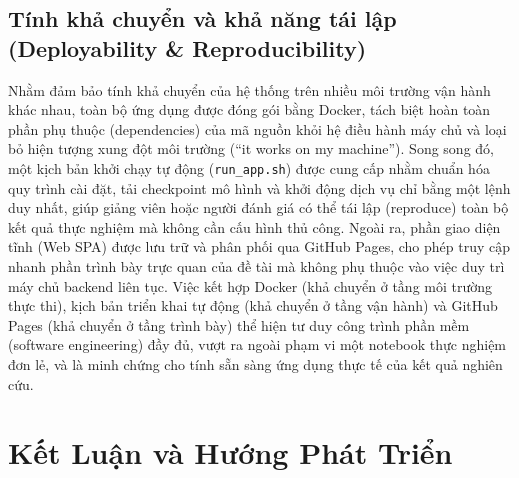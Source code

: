 \documentclass[12pt,a4paper]{article}
\begin{document}
\subsection{Tính khả chuyển và khả năng tái lập (Deployability \& Reproducibility)}\label{sec:demo_deployability}
Nhằm đảm bảo tính khả chuyển của hệ thống trên nhiều môi trường vận hành khác nhau, toàn bộ ứng dụng được đóng gói bằng Docker, tách biệt hoàn toàn phần phụ thuộc (dependencies) của mã nguồn khỏi hệ điều hành máy chủ và loại bỏ hiện tượng xung đột môi trường (``it works on my machine''). Song song đó, một kịch bản khởi chạy tự động (\texttt{run\_app.sh}) được cung cấp nhằm chuẩn hóa quy trình cài đặt, tải checkpoint mô hình và khởi động dịch vụ chỉ bằng một lệnh duy nhất, giúp giảng viên hoặc người đánh giá có thể tái lập (reproduce) toàn bộ kết quả thực nghiệm mà không cần cấu hình thủ công. Ngoài ra, phần giao diện tĩnh (Web SPA) được lưu trữ và phân phối qua GitHub Pages, cho phép truy cập nhanh phần trình bày trực quan của đề tài mà không phụ thuộc vào việc duy trì máy chủ backend liên tục. Việc kết hợp Docker (khả chuyển ở tầng môi trường thực thi), kịch bản triển khai tự động (khả chuyển ở tầng vận hành) và GitHub Pages (khả chuyển ở tầng trình bày) thể hiện tư duy công trình phần mềm (software engineering) đầy đủ, vượt ra ngoài phạm vi một notebook thực nghiệm đơn lẻ, và là minh chứng cho tính sẵn sàng ứng dụng thực tế của kết quả nghiên cứu.

\newpage
\section{Kết Luận và Hướng Phát Triển}\label{sec:chuong5}
\end{document}
